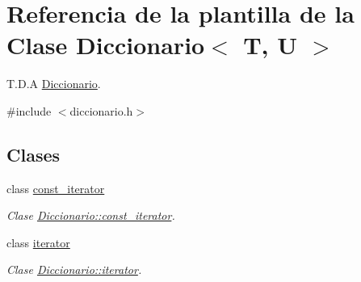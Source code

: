 \hypertarget{classDiccionario}{}\section{Referencia de la plantilla de la Clase Diccionario$<$ T, U $>$}
\label{classDiccionario}


T.\+D.\+A \hyperlink{classDiccionario}{Diccionario}.  




{\ttfamily \#include $<$diccionario.\+h$>$}

\subsection*{Clases}
\begin{DoxyCompactItemize}
\item 
class \hyperlink{classDiccionario_1_1const__iterator}{const\+\_\+iterator}
\begin{DoxyCompactList}\small\item\em Clase \hyperlink{classDiccionario_1_1const__iterator}{Diccionario\+::const\+\_\+iterator}. \end{DoxyCompactList}\item 
class \hyperlink{classDiccionario_1_1iterator}{iterator}
\begin{DoxyCompactList}\small\item\em Clase \hyperlink{classDiccionario_1_1iterator}{Diccionario\+::iterator}. \end{DoxyCompactList}\end{DoxyCompactItemize}
